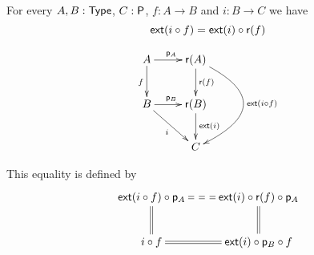 




\begin{defn}
  For every $A,B:\type$, $C:\P$, $f:A\to{}B$ and $i:B\to{}C$ we have
  \[\ext(i\circ{}f)=\ext(i)\circ\reflect(f)\]

  \[\xymatrix{
    A \ar^{\project_A}[r] \ar_f[d] & \reflect(A) \ar^{\reflect(f)}[d]
    \ar@/^15mm/^{\ext(i\circ f)}[dd] \\
    B \ar^{\project_B}[r] \ar_i[rd] & \reflect(B) \ar^{\ext(i)}[d] \\
    & C}\]

  This equality is defined by
  \[\xymatrix{
    \ext(i\circ f)\circ\project_A \ar@{==}[r] \ar@{=}[d] &
    \ext(i)\circ\reflect(f)\circ\project_A \ar@{=}[d] \\
    i\circ f \ar@{=}[r] & \ext(i)\circ\project_B\circ f
  }\]

\end{defn}


